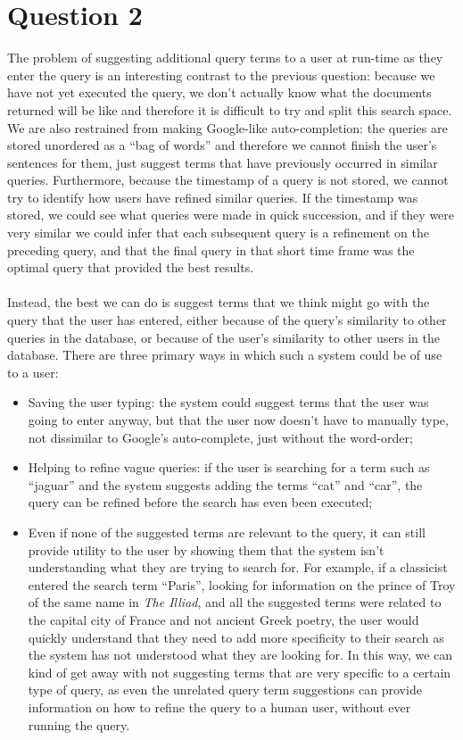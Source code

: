 \documentclass[a4paper]{article}
\begin{document}
\section{Question 2}
The problem of suggesting additional query terms to a user at run-time as they enter the query is an interesting contrast to the previous question: because we have not yet executed the query, we don't actually know what the documents returned will be like and therefore it is difficult to try and split this search space.
We are also restrained from making Google-like auto-completion: the queries are stored unordered as a ``bag of words'' and therefore we cannot finish the user's sentences for them, just suggest terms that have previously occurred in similar queries.
Furthermore, because the timestamp of a query is not stored, we cannot try to identify how users have refined similar queries.
If the timestamp was stored, we could see what queries were made in quick succession, and if they were very similar we could infer that each subsequent query is a refinement on the preceding query, and that the final query in that short time frame was the optimal query that provided the best results.
\\\\
Instead, the best we can do is suggest terms that we think might go with the query that the user has entered, either because of the query's similarity to other queries in the database, or because of the user's similarity to other users in the database.
There are three primary ways in which such a system could be of use to a user:
\begin{itemize}
    \item   Saving the user typing: the system could suggest terms that the user was going to enter anyway, but that the user now doesn't have to manually type, not dissimilar to Google's auto-complete, just without the word-order;
    \item   Helping to refine vague queries: if the user is searching for a term such as ``jaguar'' and the system suggests adding the terms ``cat'' and ``car'', the query can be refined before the search has even been executed;
    \item   Even if none of the suggested terms are relevant to the query, it can still provide utility to the user by showing them that the system isn't understanding what they are trying to search for.
        For example, if a classicist entered the search term ``Paris'', looking for information on the prince of Troy of the same name in \textit{The Illiad}, and all the suggested terms were related to the capital city of France and not ancient Greek poetry, the user would quickly understand that they need to add more specificity to their search as the system has not understood what they are looking for.
        In this way, we can kind of get away with not suggesting terms that are very specific to a certain type of query, as even the unrelated query term suggestions can provide information on how to refine the query to a human user, without ever running the query.
\end{itemize}
\end{document}
